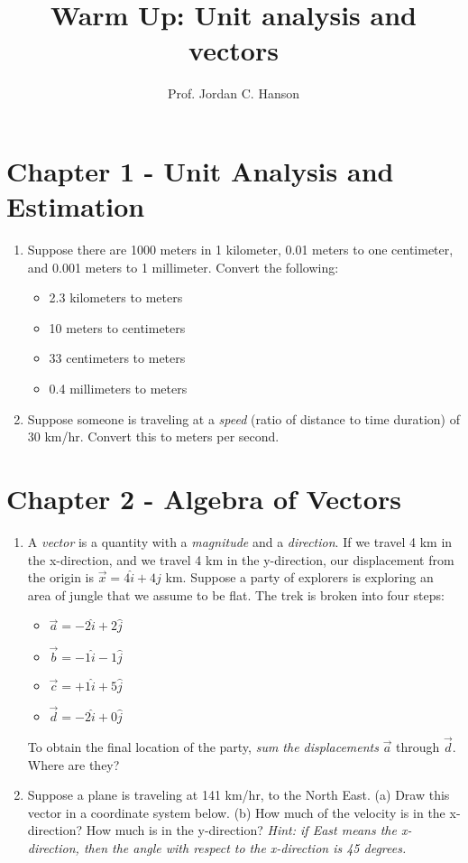 \documentclass{article}
\begin{document}
\title{Warm Up: Unit analysis and vectors}
\author{Prof. Jordan C. Hanson}

\maketitle

\section{Chapter 1 - Unit Analysis and Estimation}

\begin{enumerate}
\item Suppose there are 1000 meters in 1 kilometer, 0.01 meters to one centimeter, and 0.001 meters to 1 millimeter.  Convert the following:
\begin{itemize}
\item 2.3 kilometers to meters
\item 10 meters to centimeters
\item 33 centimeters to meters
\item 0.4 millimeters to meters
\end{itemize}
\item Suppose someone is traveling at a \textit{speed} (ratio of distance to time duration) of 30 km/hr.  Convert this to meters per second. \\ \vspace{1cm}
\end{enumerate}

\section{Chapter 2 - Algebra of Vectors}

\begin{enumerate}
\item A \textit{vector} is a quantity with a \textit{magnitude} and a \textit{direction}.  If we travel 4 km in the x-direction, and we travel 4 km in the y-direction, our displacement from the origin is $\vec{x} = 4 \hat{i} + 4\hat{j}$ km.  Suppose a party of explorers is exploring an area of jungle that we assume to be flat.  The trek is broken into four steps:
\begin{itemize}
\item $\vec{a} = -2 \hat{i} + 2\hat{j}$
\item $\vec{b} = -1 \hat{i} - 1\hat{j}$
\item $\vec{c} = +1 \hat{i} + 5\hat{j}$
\item $\vec{d} = -2 \hat{i} + 0\hat{j}$
\end{itemize}
To obtain the final location of the party, \textit{sum the displacements} $\vec{a}$ through $\vec{d}$.  Where are they? \\ \vspace{1.5cm}
\item Suppose a plane is traveling at 141 km/hr, to the North East.  (a) Draw this vector in a coordinate system below.  (b) How much of the velocity is in the x-direction?  How much is in the y-direction?  \textit{Hint: if East means the x-direction, then the angle with respect to the x-direction is 45 degrees.}
\end{enumerate}
\end{document}
